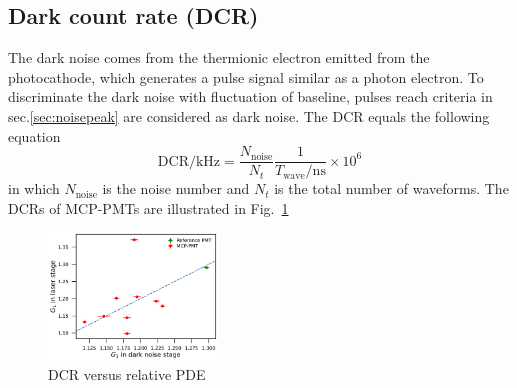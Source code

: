 \subsection{Dark count rate (DCR)}
The dark noise comes from the thermionic electron emitted from the photocathode, which generates a pulse signal similar as a photon electron. To discriminate the dark noise with fluctuation of baseline, pulses reach criteria in sec.\ref{sec:noisepeak} are considered as dark noise. The DCR equals the following equation
\begin{equation}
    \mathrm{DCR/kHz} = \frac{N_{\mathrm{noise}}}{N_{t}}\frac{1}{T_{\mathrm{wave}}/\mathrm{ns}}\times 10^{6}
\end{equation}
in which $N_{\mathrm{noise}}$ is the noise number and $N_{t}$ is the total number of waveforms. The DCRs of MCP-PMTs are illustrated in Fig.~\ref{fig:DCRCompare}

\begin{figure}[!htbp]
    \centering
    \includegraphics[width=0.4\textwidth,page=8]{figures/result/compare.pdf}
    \caption{DCR versus relative PDE}
    \label{fig:DCRCompare}
\end{figure}

